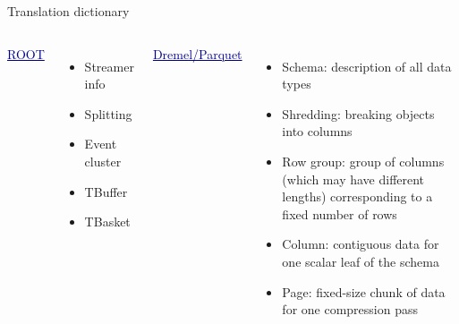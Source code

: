 \documentclass{beamer}
\begin{document}
\begin{frame}{Translation dictionary}
\vspace{0.5 cm}
\begin{columns}[t]
\textcolor{darkblue}{\underline{\large ROOT}}

\vspace{0.2 cm}
\begin{itemize}\setlength{\itemsep}{0.2 cm}
\item Streamer info
\item Splitting
\item Event cluster

\vspace{2\baselineskip}

\item TBuffer

\vspace{\baselineskip}

\item TBasket
\end{itemize}

\textcolor{darkblue}{\underline{\large Dremel/Parquet}}

\vspace{0.2 cm}
\begin{itemize}\setlength{\itemsep}{0.2 cm}
\item Schema: description of all data types
\item Shredding: breaking objects into columns
\item Row group: group of columns (which may have different lengths) corresponding to a fixed number of rows
\item Column: contiguous data for one scalar leaf of the schema
\item Page: fixed-size chunk of data for one compression pass
\end{itemize}
\end{columns}
\end{frame}
\end{document}
